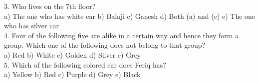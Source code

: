 \documentclass[
]{article}
\begin{document}
3. Who lives on the 7th floor?\\
a) The one who has white car \hspace{2mm}b) Balaji
\hspace{2mm}c) Ganesh \hspace{2mm}d) Both (a) and (c)
\hspace{2mm}e) The one who has silver car\\

4. Four of the following five are alike in a certain way and hence they form a group. Which
one of the following does not belong to that group?\\
a) Red \hspace{2mm}b) White \hspace{2mm}c) Golden \hspace{2mm}d) Silver \hspace{2mm}e) Grey\\

5. Which of the following colored car does Feriq has?\\
a) Yellow \hspace{2mm}b) Red \hspace{2mm}c) Purple \hspace{2mm}d) Grey \hspace{2mm}e) Black\\
\end{document}
